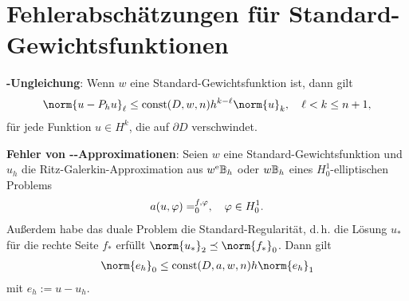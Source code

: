 \section{%
    Fehlerabschätzungen für Standard-Gewichtsfunktionen%
}

\textbf{-Ungleichung}:
Wenn $w$ eine Standard-Gewichtsfunktion ist, dann gilt
\begin{align*}
    \norm{u - P_h u}_\ell \le \const(D, w, n) h^{k-\ell} \norm{u}_k,\quad
    \ell < k \le n + 1,
\end{align*}
für jede Funktion $u \in H^k$, die auf $\partial D$ verschwindet.

\textbf{Fehler von --Approximationen}:
Seien $w$ eine Standard-Gewichtsfunktion und
$u_h$ die Ritz-Galerkin-Approximation aus $w^{\mathrm{e}}\mathbb{B}_h$ oder $w\mathbb{B}_h$ eines $H_0^1$-elliptischen
Problems
\begin{align*}
    a(u, \varphi) = \sp{f, \varphi}_0,\quad
    \varphi \in H_0^1.
\end{align*}
Außerdem habe das duale Problem die Standard-Regularität, d.\,h.
die Lösung $u_\ast$ für die rechte Seite $f_\ast$ erfüllt
$\norm{u_\ast}_2 \preceq \norm{f_\ast}_0$.
Dann gilt
\begin{align*}
    \norm{e_h}_0
    \le \const(D, a, w, n) h \norm{e_h}_1
\end{align*}
mit $e_h := u - u_h$.

\pagebreak

